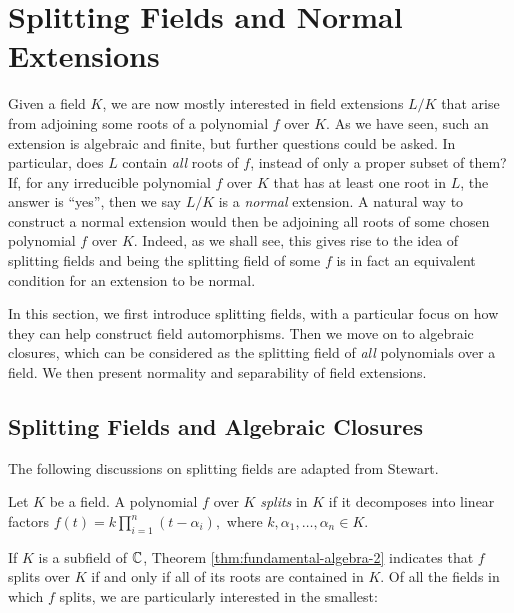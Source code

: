 \section{Splitting Fields and Normal Extensions}

Given a field $K$, we are now mostly interested in field extensions $L/K$ that arise from adjoining some roots of a polynomial $f$ over $K$. As we have seen, such an extension is algebraic and finite, but further questions could be asked. In particular, does $L$ contain \textit{all} roots of $f$, instead of only a proper subset of them? If,  for any irreducible polynomial $f$ over $K$ that has at least one root in $L$, the answer is ``yes'', then we say $L/K$ is a \textit{normal} extension. 
A natural way to construct a normal extension would then be adjoining all roots of some chosen polynomial $f$ over $K$. Indeed, as we shall see, this gives rise to the idea of splitting fields and being the splitting field of some $f$ is in fact an equivalent condition for an extension to be normal. 

In this section, we first introduce splitting fields, with a particular focus on how they can help construct field automorphisms. Then we move on to algebraic closures, which can be considered as the splitting field of \textit{all} polynomials over a field. We then present normality and separability of field extensions. 



\subsection{Splitting Fields and Algebraic Closures}

The following discussions on splitting fields are adapted from Stewart\cite{Stewart}. 
\begin{definition}
    Let $K$ be a field. A polynomial $f$ over $K$ \textit{splits} in $K$ if it decomposes into linear factors $
    f(t) = k \prod _{i=1} ^n (t - \alpha_i),
    $
    where $k, \alpha_1, \ldots, \alpha_n \in K$. 
\end{definition}
If $K$ is a subfield of $\mathbb C$, Theorem \ref{thm:fundamental-algebra-2} indicates that $f$ splits over $K$ if and only if all of its roots are contained in $K$. 
Of all the fields in which $f$ splits, we are particularly interested in the smallest:

